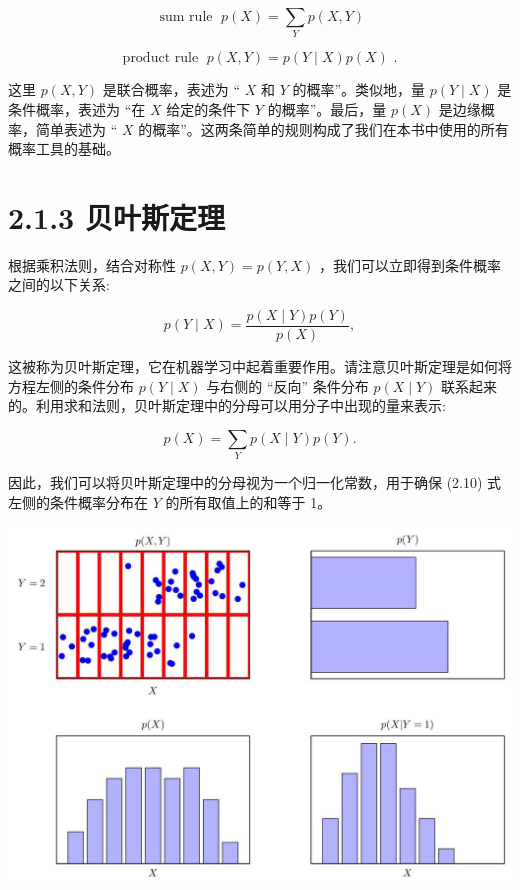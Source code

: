 \documentclass[10pt]{article}
\begin{document}
\[
\text{ sum rule }\;p\left( X\right)  = \mathop{\sum }\limits_{Y}p\left( {X,Y}\right)  \tag{2.8}
\]

\[
\text{ product rule }\;p\left( {X,Y}\right)  = p\left( {Y \mid  X}\right) p\left( X\right) \text{ . } \tag{2.9}
\]

这里 \(p\left( {X,Y}\right)\) 是联合概率，表述为 “ \(X\) 和 \(Y\) 的概率”。类似地，量 \(p\left( {Y \mid  X}\right)\) 是条件概率，表述为 “在 \(X\) 给定的条件下 \(Y\) 的概率”。最后，量 \(p\left( X\right)\) 是边缘概率，简单表述为 “ \(X\) 的概率”。这两条简单的规则构成了我们在本书中使用的所有概率工具的基础。

\section*{2.1.3 贝叶斯定理}

根据乘积法则，结合对称性 \(p\left( {X,Y}\right)  = p\left( {Y,X}\right)\) ，我们可以立即得到条件概率之间的以下关系:

\[
p\left( {Y \mid  X}\right)  = \frac{p\left( {X \mid  Y}\right) p\left( Y\right) }{p\left( X\right) }, \tag{2.10}
\]

这被称为贝叶斯定理，它在机器学习中起着重要作用。请注意贝叶斯定理是如何将方程左侧的条件分布 \(p\left( {Y \mid  X}\right)\) 与右侧的 “反向” 条件分布 \(p\left( {X \mid  Y}\right)\) 联系起来的。利用求和法则，贝叶斯定理中的分母可以用分子中出现的量来表示:

\[
p\left( X\right)  = \mathop{\sum }\limits_{Y}p\left( {X \mid  Y}\right) p\left( Y\right) . \tag{2.11}
\]

因此，我们可以将贝叶斯定理中的分母视为一个归一化常数，用于确保 (2.10) 式左侧的条件概率分布在 \(Y\) 的所有取值上的和等于 1。

\begin{center}
\includegraphics[max width=1.0\textwidth]{images/0194e279-9b28-703a-88f4-c3ac21e2010d_48_213_376_1321_932_0.jpg}
\end{center}
\hspace*{3em} 
\end{document}
